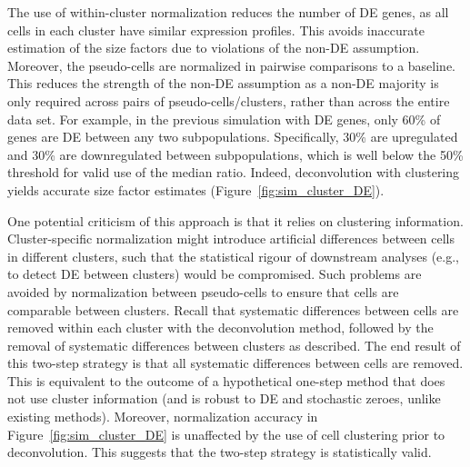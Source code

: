 \documentclass{article}
\begin{document}
The use of within-cluster normalization reduces the number of DE genes, as all cells in each cluster have similar expression profiles.
This avoids inaccurate estimation of the size factors due to violations of the non-DE assumption.
Moreover, the pseudo-cells are normalized in pairwise comparisons to a baseline.
This reduces the strength of the non-DE assumption as a non-DE majority is only required across pairs of pseudo-cells/clusters, rather than across the entire data set.
For example, in the previous simulation with DE genes, only 60\% of genes are DE between any two subpopulations.
Specifically, 30\% are upregulated and 30\% are downregulated between subpopulations, which is well below the 50\% threshold for valid use of the median ratio.
Indeed, deconvolution with clustering yields accurate size factor estimates (Figure~\ref{fig:sim_cluster_DE}).

One potential criticism of this approach is that it relies on clustering information.
Cluster-specific normalization might introduce artificial differences between cells in different clusters, 
    such that the statistical rigour of downstream analyses (e.g., to detect DE between clusters) would be compromised.
Such problems are avoided by normalization between pseudo-cells to ensure that cells are comparable between clusters.
Recall that systematic differences between cells are removed within each cluster with the deconvolution method, 
    followed by the removal of systematic differences between clusters as described.
The end result of this two-step strategy is that all systematic differences between cells are removed.
This is equivalent to the outcome of a hypothetical one-step method that does not use cluster information (and is robust to DE and stochastic zeroes, unlike existing methods).
Moreover, normalization accuracy in Figure~\ref{fig:sim_cluster_DE} is unaffected by the use of cell clustering prior to deconvolution.
This suggests that the two-step strategy is statistically valid.
\end{document}
